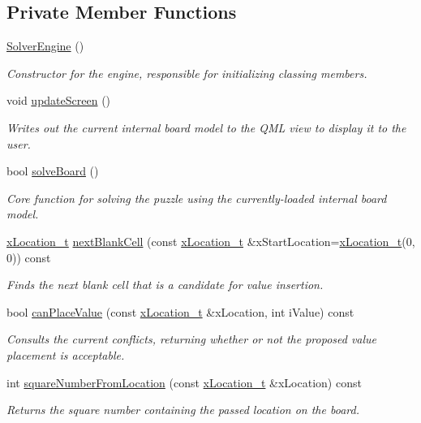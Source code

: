 \subsection*{Private Member Functions}
\begin{DoxyCompactItemize}
\item 
\mbox{\hyperlink{class_solver_engine_a677b5fe26a9eea0dea994cc3f9027211}{Solver\+Engine}} ()
\begin{DoxyCompactList}\small\item\em Constructor for the engine, responsible for initializing classing members. \end{DoxyCompactList}\item 
void \mbox{\hyperlink{class_solver_engine_a24a236b02f997c594c259d15167e32d1}{update\+Screen}} ()
\begin{DoxyCompactList}\small\item\em Writes out the current internal board model to the Q\+ML view to display it to the user. \end{DoxyCompactList}\item 
bool \mbox{\hyperlink{class_solver_engine_a8c1f32f617ef8c5b83c4bef56e7dc89a}{solve\+Board}} ()
\begin{DoxyCompactList}\small\item\em Core function for solving the puzzle using the currently-\/loaded internal board model. \end{DoxyCompactList}\item 
\mbox{\hyperlink{struct_solver_engine_1_1x_location__t}{x\+Location\+\_\+t}} \mbox{\hyperlink{class_solver_engine_a27aa053eb5e2a7abb602b7763ec6dea8}{next\+Blank\+Cell}} (const \mbox{\hyperlink{struct_solver_engine_1_1x_location__t}{x\+Location\+\_\+t}} \&x\+Start\+Location=\mbox{\hyperlink{struct_solver_engine_1_1x_location__t}{x\+Location\+\_\+t}}(0, 0)) const
\begin{DoxyCompactList}\small\item\em Finds the next blank cell that is a candidate for value insertion. \end{DoxyCompactList}\item 
bool \mbox{\hyperlink{class_solver_engine_a7e9939f155549012b8be1bb854eba5c3}{can\+Place\+Value}} (const \mbox{\hyperlink{struct_solver_engine_1_1x_location__t}{x\+Location\+\_\+t}} \&x\+Location, int i\+Value) const
\begin{DoxyCompactList}\small\item\em Consults the current conflicts, returning whether or not the proposed value placement is acceptable. \end{DoxyCompactList}\item 
int \mbox{\hyperlink{class_solver_engine_a3b515701f25827a9d817e7ca529f9b80}{square\+Number\+From\+Location}} (const \mbox{\hyperlink{struct_solver_engine_1_1x_location__t}{x\+Location\+\_\+t}} \&x\+Location) const
\begin{DoxyCompactList}\small\item\em Returns the square number containing the passed location on the board. \end{DoxyCompactList}\end{DoxyCompactItemize}
